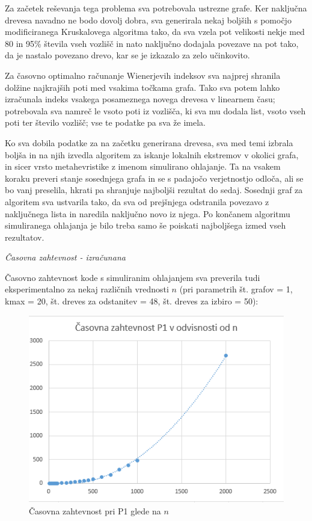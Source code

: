\documentclass[a4paper, 12 pt]{article}
\begin{document}
Za začetek reševanja tega problema sva potrebovala ustrezne grafe. Ker naključna drevesa navadno ne bodo dovolj dobra, sva generirala nekaj boljših s pomočjo modificiranega Kruskalovega algoritma tako, da sva vzela pot velikosti nekje med 80 in 95\% števila vseh vozlišč in nato naključno dodajala povezave na pot tako, da je nastalo povezano drevo, kar se je izkazalo za zelo učinkovito.
\vspace{0.5cm}

Za časovno optimalno računanje Wienerjevih indeksov sva najprej shranila dolžine najkrajših poti med vsakima točkama grafa. Tako sva potem lahko izračunala indeks vsakega posameznega novega drevesa v linearnem času; potrebovala sva namreč le vsoto poti iz vozlišča, ki sva mu dodala list, vsoto vseh poti ter število vozlišč; vse te podatke pa sva že imela.
\vspace{0.5cm}

 Ko sva dobila podatke za na začetku generirana drevesa, sva med temi izbrala boljša in na njih izvedla algoritem za iskanje lokalnih ekstremov v okolici grafa, in sicer vrsto metahevristike z imenom simulirano ohlajanje. Ta na vsakem koraku preveri stanje sosednjega grafa in se s padajočo verjetnostjo odloča, ali se bo vanj preselila, hkrati pa shranjuje najboljši rezultat do sedaj. Sosednji graf za algoritem sva ustvarila tako, da sva od prejšnjega odstranila povezavo z naključnega lista in naredila naključno novo iz njega. Po končanem algoritmu simuliranega ohlajanja je bilo treba samo še poiskati najboljšega izmed vseh rezultatov.
\vspace{0.5cm}

\vspace{1cm}

\textit{Časovna zahtevnost - izračunana}

\vspace{1cm}

Časovno zahtevnost kode s simuliranim ohlajanjem sva preverila tudi eksperimentalno za nekaj različnih vrednosti $n$ (pri parametrih št. grafov = 1, kmax = 20, št. dreves za odstanitev = 48, št. dreves za izbiro = 50):

\begin{figure}[H]
\centering
  \includegraphics[width=12cm]{casovna_p1_n.png}
  \caption{Časovna zahtevnost pri P1 glede na $n$}
  \label{fig:p1_časovna_zaht_n} 
\end{figure}
\end{document}
